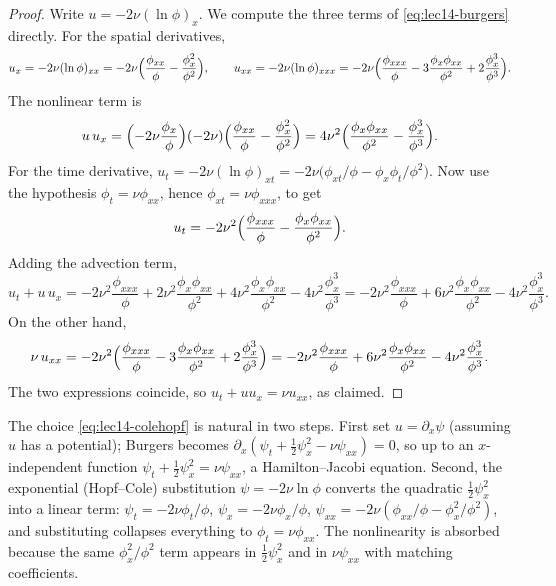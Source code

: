 \begin{proof}
Write $u=-2\nu(\ln\phi)_x$. We compute the three terms of \eqref{eq:lec14-burgers} directly. For
the spatial derivatives,
\[
  u_x=-2\nu(\ln\phi)_{xx}=-2\nu\Bigl(\frac{\phi_{xx}}{\phi}-\frac{\phi_x^2}{\phi^2}\Bigr),
  \qquad
  u_{xx}=-2\nu(\ln\phi)_{xxx}
        =-2\nu\Bigl(\frac{\phi_{xxx}}{\phi}-3\frac{\phi_x\phi_{xx}}{\phi^2}
          +2\frac{\phi_x^3}{\phi^3}\Bigr).
\]
The nonlinear term is
\[
  u\,u_x=\Bigl(-2\nu\frac{\phi_x}{\phi}\Bigr)(-2\nu)
    \Bigl(\frac{\phi_{xx}}{\phi}-\frac{\phi_x^2}{\phi^2}\Bigr)
   =4\nu^2\Bigl(\frac{\phi_x\phi_{xx}}{\phi^2}-\frac{\phi_x^3}{\phi^3}\Bigr).
\]
For the time derivative, $u_t=-2\nu(\ln\phi)_{xt}=-2\nu\bigl(\phi_{xt}/\phi-\phi_x\phi_t/\phi^2
\bigr)$. Now use the hypothesis $\phi_t=\nu\phi_{xx}$, hence $\phi_{xt}=\nu\phi_{xxx}$, to get
\[
  u_t=-2\nu^2\Bigl(\frac{\phi_{xxx}}{\phi}-\frac{\phi_x\phi_{xx}}{\phi^2}\Bigr).
\]
Adding the advection term,
\[
  u_t+u\,u_x
  =-2\nu^2\frac{\phi_{xxx}}{\phi}+2\nu^2\frac{\phi_x\phi_{xx}}{\phi^2}
   +4\nu^2\frac{\phi_x\phi_{xx}}{\phi^2}-4\nu^2\frac{\phi_x^3}{\phi^3}
  =-2\nu^2\frac{\phi_{xxx}}{\phi}+6\nu^2\frac{\phi_x\phi_{xx}}{\phi^2}
   -4\nu^2\frac{\phi_x^3}{\phi^3}.
\]
On the other hand,
\[
  \nu\,u_{xx}=-2\nu^2\Bigl(\frac{\phi_{xxx}}{\phi}-3\frac{\phi_x\phi_{xx}}{\phi^2}
    +2\frac{\phi_x^3}{\phi^3}\Bigr)
  =-2\nu^2\frac{\phi_{xxx}}{\phi}+6\nu^2\frac{\phi_x\phi_{xx}}{\phi^2}
   -4\nu^2\frac{\phi_x^3}{\phi^3}.
\]
The two expressions coincide, so $u_t+u u_x=\nu u_{xx}$, as claimed.
\end{proof}

\begin{remark}
\label{rem:lec14-why-colehopf}
The choice \eqref{eq:lec14-colehopf} is natural in two steps. First set $u=\partial_x\psi$
(assuming $u$ has a potential); Burgers becomes $\partial_x(\psi_t+\tfrac12\psi_x^2-\nu\psi_{xx})
=0$, so up to an $x$-independent function $\psi_t+\tfrac12\psi_x^2=\nu\psi_{xx}$, a
Hamilton--Jacobi equation. Second, the exponential (Hopf--Cole) substitution $\psi=-2\nu\ln\phi$
converts the quadratic $\tfrac12\psi_x^2$ into a linear term: $\psi_t=-2\nu\phi_t/\phi$,
$\psi_x=-2\nu\phi_x/\phi$, $\psi_{xx}=-2\nu(\phi_{xx}/\phi-\phi_x^2/\phi^2)$, and substituting
collapses everything to $\phi_t=\nu\phi_{xx}$. The nonlinearity is absorbed because the same
$\phi_x^2/\phi^2$ term appears in $\tfrac12\psi_x^2$ and in $\nu\psi_{xx}$ with matching
coefficients.
\end{remark}

